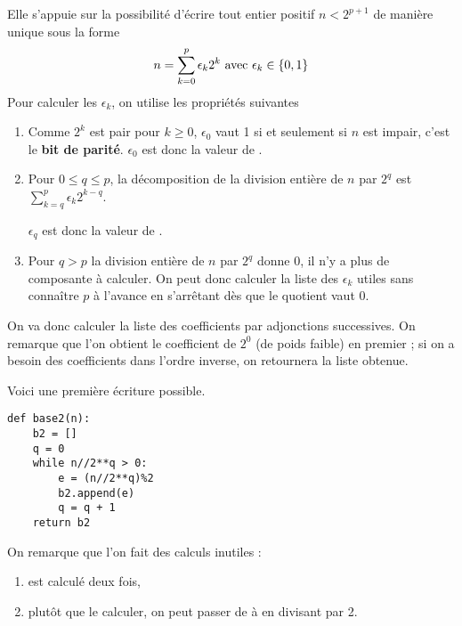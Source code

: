 Elle s'appuie sur la possibilité d'écrire tout entier positif $n < 2^{p+1}$ de manière unique sous la forme
\[n = \sum_{k=0}^p \epsilon_k2^k\hbox{ avec } \epsilon_k\in\{0, 1\}\]
Pour calculer les $\epsilon_k$, on utilise les propriétés suivantes
\begin{enumerate}
    \item Comme $2^k$ est pair pour $k\ge 0$, $\epsilon_0$ vaut 1 si et seulement si $n$ est impair, c'est le {\bf bit de parité}. $\epsilon_0$ est donc la valeur de .
    \item Pour $0\le q\le p$, la décomposition de la division entière de $n$ par $2^q$ est $\displaystyle \sum_{k=q}^p \epsilon_k2^{k-q}$. 
    
    $\epsilon_q$ est donc la valeur de .
    \item Pour $q>p$ la division entière de $n$ par $2^q$ donne 0, il n'y a plus de composante à calculer. On peut donc calculer la liste des $\epsilon_k$ utiles sans connaître $p$ à l'avance en s'arrêtant dès que le quotient  vaut 0.
\end{enumerate}

\medskip

On va donc calculer la liste des coefficients \type[e0, e1, ..., ep] par adjonctions successives. On remarque que l'on obtient le coefficient de $2^0$ (de poids faible) en premier ; si on a besoin des coefficients dans l'ordre inverse, on retournera la liste obtenue.

\medskip

Voici une première écriture possible.
\begin{lstlisting}
def base2(n):
    b2 = []
    q = 0
    while n//2**q > 0:
        e = (n//2**q)%2
        b2.append(e)
        q = q + 1
    return b2
\end{lstlisting}

\medskip

On remarque que l'on fait des calculs inutiles :

\begin{enumerate}
    \item {} est calculé deux fois,
    \item plutôt que le calculer, on peut passer de  à  en divisant par 2.
\end{enumerate}

